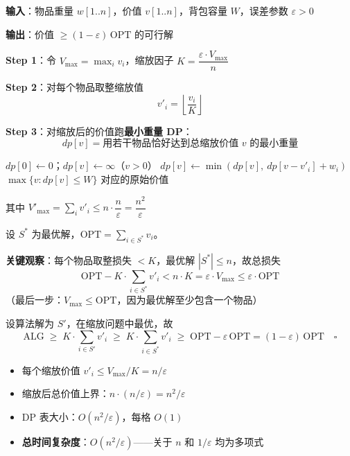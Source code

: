 \documentclass[12pt, a4paper]{ctexart}
\begin{document}
\begin{blackboard}

\textbf{输入}：物品重量 $w[1..n]$，价值 $v[1..n]$，背包容量 $W$，误差参数 $\varepsilon > 0$

\textbf{输出}：价值 $\geq (1-\varepsilon)\,\mathrm{OPT}$ 的可行解

\textbf{Step 1}：令 $V_{\max} = \max_i v_i$，缩放因子 $K = \dfrac{\varepsilon \cdot V_{\max}}{n}$

\textbf{Step 2}：对每个物品取整缩放值
\[
    v'_i = \left\lfloor \frac{v_i}{K} \right\rfloor
\]

\textbf{Step 3}：对缩放后的价值跑\textbf{最小重量 DP}：
\[
    dp[v] = \text{用若干物品恰好达到总缩放价值 } v \text{ 的最小重量}
\]
\begin{algorithmic}[1]
\STATE $dp[0] \gets 0$；$dp[v] \gets \infty$（$v > 0$）
        \STATE $dp[v] \gets \min(dp[v],\ dp[v - v'_i] + w_i)$
    \ENDFOR
\ENDFOR
\RETURN $\max\bigl\{v : dp[v] \leq W\bigr\}$ 对应的原始价值
\end{algorithmic}

其中 $V'_{\max} = \sum_i v'_i \leq n \cdot \dfrac{n}{\varepsilon} = \dfrac{n^2}{\varepsilon}$

\end{blackboard}

\begin{blackboard}[近似比证明]

设 $S^*$ 为最优解，$\mathrm{OPT} = \sum_{i \in S^*} v_i$。

\textbf{关键观察}：每个物品取整损失 $< K$，最优解 $|S^*| \leq n$，故总损失
\[
    \mathrm{OPT} - K \cdot \sum_{i \in S^*} v'_i < n \cdot K = \varepsilon \cdot V_{\max} \leq \varepsilon \cdot \mathrm{OPT}
\]
（最后一步：$V_{\max} \leq \mathrm{OPT}$，因为最优解至少包含一个物品）

设算法解为 $S'$，在缩放问题中最优，故
\[
    \mathrm{ALG} \;\geq\; K \cdot \sum_{i \in S'} v'_i \;\geq\; K \cdot \sum_{i \in S^*} v'_i \;\geq\; \mathrm{OPT} - \varepsilon\,\mathrm{OPT} = (1-\varepsilon)\,\mathrm{OPT} \quad \square
\]

\end{blackboard}

\begin{complexitybox}[0-1 背包 FPTAS]

\begin{itemize}
    \item 每个缩放价值 $v'_i \leq V_{\max}/K = n/\varepsilon$
    \item 缩放后总价值上界：$n \cdot (n/\varepsilon) = n^2/\varepsilon$
    \item DP 表大小：$O(n^2/\varepsilon)$，每格 $O(1)$
    \item \textbf{总时间复杂度}：$O(n^2/\varepsilon)$——关于 $n$ 和 $1/\varepsilon$ 均为多项式
\end{itemize}

\end{complexitybox}
\end{document}

